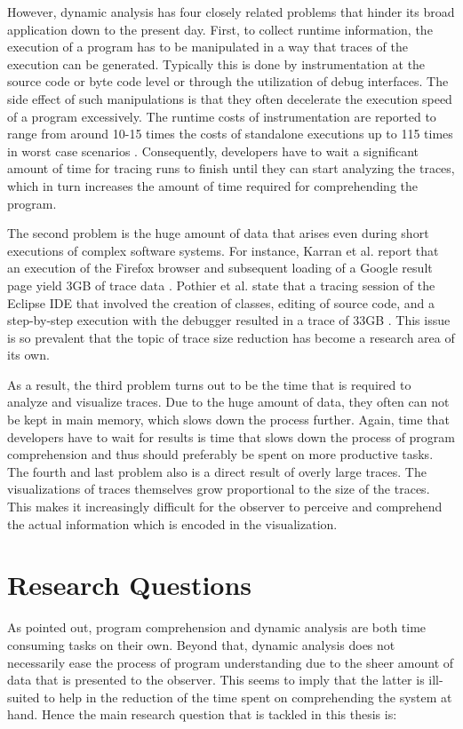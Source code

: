 However, dynamic analysis has four closely related problems that hinder its broad application down to the present day.
First, to collect runtime information, the execution of a program has to be manipulated in a way that traces of the execution can be generated.
Typically this is done by instrumentation at the source code or byte code level or through the utilization of debug interfaces.
The side effect of such manipulations is that they often decelerate the execution speed of a program excessively.
The runtime costs of instrumentation are reported to range from around 10-15 times the costs of standalone executions up to 115 times in worst case scenarios \cite{pothier_scalable_2007, karran_synctrace:_2013}.
Consequently, developers have to wait a significant amount of time for tracing runs to finish until they can start analyzing the traces, which in turn increases the amount of time required for comprehending the program.

The second problem is the huge amount of data that arises even during short executions of complex software systems.
For instance, Karran et al. report that an execution of the Firefox browser and subsequent loading of a Google result page yield 3GB of trace data \cite{karran_synctrace:_2013}.
Pothier et al. state that a tracing session of the Eclipse IDE that involved the creation of classes, editing of source code, and a step-by-step execution with the debugger resulted in a trace of 33GB \cite{pothier_scalable_2007}.
This issue is so prevalent that the topic of trace size reduction has become a research area of its own.

As a result, the third problem turns out to be the time that is required to analyze and visualize traces.
Due to the huge amount of data, they often can not be kept in main memory, which slows down the process further.
Again, time that developers have to wait for results is time that slows down the process of program comprehension and thus should preferably be spent on more productive tasks.
The fourth and last problem also is a direct result of overly large traces.
The visualizations of traces themselves grow proportional to the size of the traces.
This makes it increasingly difficult for the observer to perceive and comprehend the actual information which is encoded in the visualization.

\section{Research Questions}
As pointed out, program comprehension and dynamic analysis are both time consuming tasks on their own.
Beyond that, dynamic analysis does not necessarily ease the process of program understanding due to the sheer amount of data that is presented to the observer.
This seems to imply that the latter is ill-suited to help in the reduction of the time spent on comprehending the system at hand.
Hence the main research question that is tackled in this thesis is:

